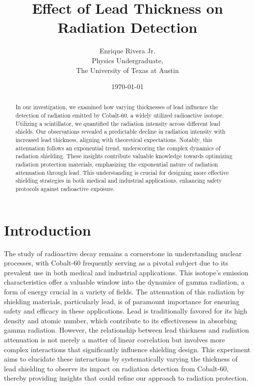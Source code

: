 \documentclass[12pt]{article}
\title{Effect of Lead Thickness on Radiation Detection}
\author{Enrique Rivera Jr. \\
        Physics Undergraduate, \\ 
        The University of Texas at Austin}
\date{\today}
\begin{document}
\maketitle

\begin{abstract}
    In our investigation, we examined how varying thicknesses of lead 
    influence the detection of radiation emitted by Cobalt-60, a widely utilized radioactive isotope. 
    Utilizing a scintillator, we quantified the radiation intensity across different lead shields. 
    Our observations revealed a predictable decline in radiation intensity with increased lead thickness, 
    aligning with theoretical expectations. Notably, this attenuation follows an exponential trend, 
    underscoring the complex dynamics of radiation shielding. These insights contribute valuable knowledge towards 
    optimizing radiation protection materials, emphasizing the exponential nature of radiation attenuation 
    through lead. This understanding is crucial for designing more effective shielding strategies in 
    both medical and industrial applications, enhancing safety protocols against radioactive exposure.
\end{abstract}

\section{Introduction}
    The study of radioactive decay remains a cornerstone in understanding nuclear processes, 
    with Cobalt-60 frequently serving as a pivotal subject due to its prevalent use in both 
    medical and industrial applications. This isotope's emission characteristics offer a 
    valuable window into the dynamics of gamma radiation, a form of energy crucial in a 
    variety of fields. The attenuation of this radiation by shielding materials, particularly lead, 
    is of paramount importance for ensuring safety and efficacy in these applications. 
    Lead is traditionally favored for its high density and atomic number, which contribute to 
    its effectiveness in absorbing gamma radiation. However, the relationship between lead thickness 
    and radiation attenuation is not merely a matter of linear correlation but involves more 
    complex interactions that significantly influence shielding design. This experiment aims to elucidate 
    these interactions by systematically varying the thickness of lead shielding to observe its impact 
    on radiation detection from Cobalt-60, thereby providing insights that could refine our 
    approach to radiation protection.
\end{document}

